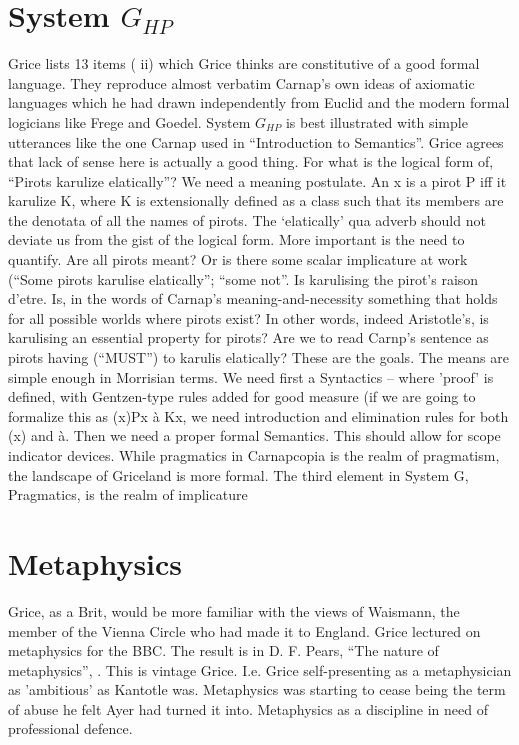 \documentclass[10pt,titlepage]{book}
\begin{document}
{\section{System $G_{HP}$}

Grice lists 13 items (\cite{grice89} ii) which Grice thinks are constitutive of a good formal language.
They reproduce almost verbatim Carnap’s own ideas of axiomatic languages which he had drawn independently from Euclid and the modern formal logicians like Frege and Goedel.
System $G_{HP}$ is best illustrated with simple utterances like the one Carnap used in ``Introduction to Semantics''.
Grice agrees that lack of sense here is actually a good thing.
For what is the logical  form of, ``Pirots karulize elatically''?
We need a meaning postulate.
An x is a pirot P iff it karulize K, where K is extensionally defined as a class such that its members are the denotata of all 
the names of pirots.
The ‘elatically’ qua adverb should not deviate us from the gist of the logical form.
More important is the need to quantify.
Are all pirots meant?
Or is there some scalar implicature at work (``Some pirots karulise elatically''; ``some not''.
Is karulising the pirot’s  raison d’etre.
Is, in the words of Carnap’s meaning-and-necessity something that holds for all possible worlds where pirots exist?
In other words, indeed Aristotle’s, is karulising an essential property for pirots?
Are we to read Carnp's sentence as pirots having (``MUST'') to karulis elatically?
These are the  goals.
The means are simple enough in Morrisian terms.
We need first a Syntactics  – where 'proof' is defined, with Gentzen-type rules added for good measure (if we are going to formalize this as (x)Px à Kx, we need introduction and elimination rules for both (x) and à.
Then we need a proper formal Semantics.
This should allow for scope indicator devices.
While pragmatics in Carnapcopia is the realm of pragmatism, the landscape of Griceland is more formal.
The third element in System G, Pragmatics, is the realm of implicature 

\section{Metaphysics}

Grice, as a Brit, would be more familiar with the views of Waismann, the member of the Vienna Circle who had made it to  England.
Grice lectured on metaphysics for the BBC.
The result is in D. F. Pears, ``The nature of metaphysics'', \cite{grice57}.
This is vintage Grice.
I.e. Grice self-presenting as a metaphysician as 'ambitious' as Kantotle was.
Metaphysics was starting to cease being the term of abuse he felt Ayer had turned it into. 
Metaphysics as a discipline in need of professional defence.

}
\end{document}
